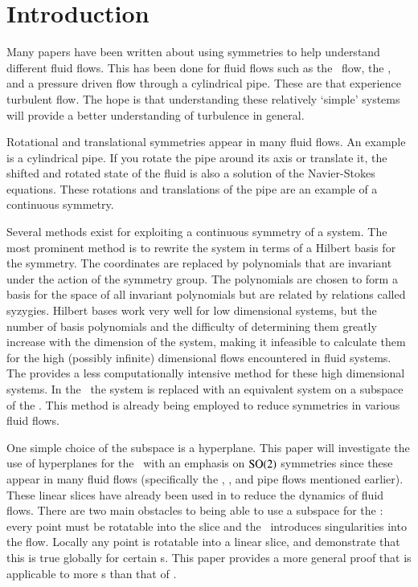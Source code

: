 \section{Introduction}
\label{sect:intro}

Many papers have been written about using symmetries to help understand different fluid flows. This has been done for fluid flows such as the \KS\ flow, the {\pCf}, and a pressure driven flow through a cylindrical pipe. These are  that experience turbulent flow. The hope is that understanding these relatively `simple' systems will provide a better understanding of turbulence in general.

Rotational and translational symmetries appear in many fluid flows. An example is a cylindrical pipe. If you rotate the pipe around its axis or translate it, the shifted and rotated state of the fluid is also a solution of the Navier-Stokes equations. These rotations and translations of the pipe are an example of a continuous symmetry.

Several methods exist for exploiting a continuous symmetry of a system. The most prominent method is to rewrite the system in terms of a Hilbert basis for the symmetry. The {\statesp} coordinates are replaced by polynomials that are invariant under the action of the symmetry group. The polynomials are chosen to form a basis for the space of all invariant polynomials but are related by relations called syzygies. Hilbert bases work very well for low dimensional systems, but the number of basis polynomials and the difficulty of determining them greatly increase with the dimension of the system, making it infeasible to calculate them for the high (possibly infinite) dimensional flows encountered in fluid systems. The \mslices{} provides a less computationally intensive method for these high dimensional systems. In the \mslices\ the system is replaced with an equivalent system on a subspace of the \statesp. This method is already being employed to reduce symmetries in various fluid flows.

One simple choice of the subspace is a hyperplane. This paper will investigate the use of hyperplanes for the \mslices\ with an emphasis on $\textrm{SO}(2)$ symmetries since these appear in many fluid flows (specifically the \KS, {\pCf}, and pipe flows mentioned earlier). These linear slices have already been used in  to reduce the dynamics of fluid flows. There are two main obstacles to being able to use a subspace for the \mslices: every point must be rotatable into the slice and the \mslices\ introduces singularities into the flow. Locally any point is rotatable into a linear slice, and  demonstrate that this is true globally for certain {\statesp}s. This paper provides a more general proof that is applicable to more {\statesp}s than that of .

